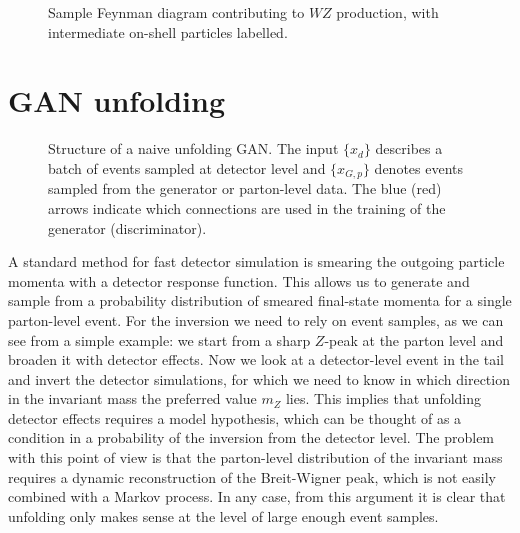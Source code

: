 \begin{figure}[b!]
\begin{center}

\end{center}
\caption{Sample Feynman diagram contributing to $WZ$ production, with
  intermediate on-shell particles labelled.}
\label{fig:feyn_intro}
\end{figure}

\section{GAN unfolding}
\label{sec:ganunfolding}

\begin{figure}[t]
\centering

\caption{Structure of a naive unfolding GAN. The input $\{ x_d \}$
  describes a batch of events sampled at detector level and $\{
  x_{G,p} \}$ denotes events sampled from the generator or
  parton-level data. The blue (red) arrows indicate which
  connections are used in the training of the generator
  (discriminator).}
\label{fig:GANs}
\end{figure}

A standard method for fast detector simulation is
smearing the outgoing particle momenta with a detector response
function. This allows us to generate and sample from a probability
distribution of smeared final-state momenta for a single parton-level
event. For the inversion we need to rely on event samples, as we can
see from a simple example: we start from a sharp $Z$-peak at the
parton level and broaden it with detector effects. Now we look at a
detector-level event in the tail and invert the detector simulations,
for which we need to know in which direction in the invariant mass the
preferred value $m_Z$ lies. This implies that unfolding detector
effects requires a model hypothesis, which can be thought of as a
condition in a probability of the inversion from the detector
level. The problem with this point of view is that the parton-level
distribution of the invariant mass requires a dynamic reconstruction
of the Breit-Wigner peak, which is not easily combined with a Markov
process. In any case, from this argument it is clear that unfolding
only makes sense at the level of large enough event samples.

